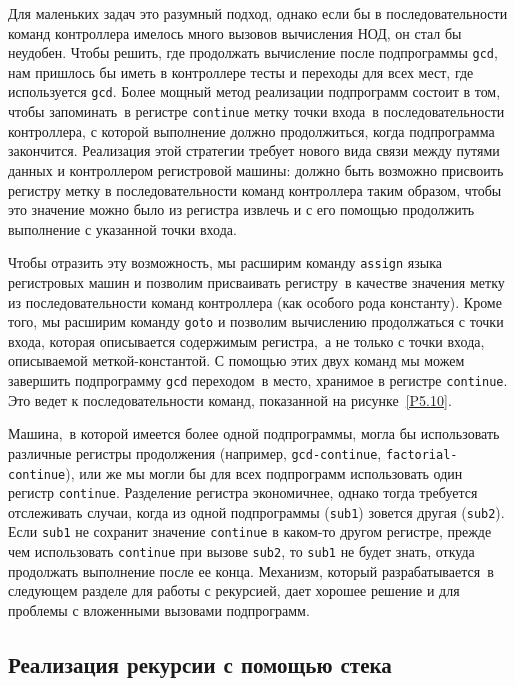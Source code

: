 Для маленьких задач это разумный подход, однако если бы
в последовательности команд контроллера имелось много вызовов
вычисления НОД, он стал бы неудобен.  Чтобы решить, где продолжать
вычисление после подпрограммы {\tt gcd}, нам пришлось бы иметь
в контроллере тесты и переходы для всех мест, где используется
{\tt gcd}. Более мощный метод реализации подпрограмм состоит в
том, чтобы запоминать~в регистре {\tt continue} метку точки
входа~в последовательности контроллера, с которой выполнение должно
продолжиться, когда подпрограмма закончится.  Реализация этой
стратегии требует нового вида связи между путями данных и контроллером
регистровой машины: должно быть возможно присвоить регистру метку в
последовательности команд контроллера таким образом, чтобы это
значение можно было из регистра извлечь и с его помощью продолжить
выполнение с указанной точки входа.

Чтобы отразить эту возможность, мы расширим команду
{\tt assign}
языка регистровых машин и позволим присваивать
регистру~в качестве значения метку из последовательности команд
контроллера (как особого рода константу). Кроме того, мы расширим
команду {\tt goto} 
и позволим вычислению продолжаться с точки входа,
которая описывается содержимым регистра,~а не только с точки входа,
описываемой меткой-константой.  С помощью этих двух команд мы можем
завершить подпрограмму {\tt gcd} переходом~в место, хранимое в
регистре {\tt continue}.  Это ведет к последовательности
команд, показанной на рисунке~\ref{P5.10}.

Машина,~в которой имеется более одной подпрограммы, могла
бы использовать различные регистры продолжения (например,
{\tt gcd-continue}, {\tt facto\-rial-con\-ti\-nue}), или же мы
могли бы для всех подпрограмм использовать один регистр
{\tt continue}.  Разделение регистра экономичнее, однако
тогда требуется отслеживать случаи, когда из одной подпрограммы
({\tt sub1}) зовется другая ({\tt sub2}).  Если
{\tt sub1} не сохранит значение {\tt continue} в
каком-то другом регистре, прежде чем использовать
{\tt continue} при вызове {\tt sub2}, то {\tt sub1}
не будет знать, откуда продолжать выполнение после ее конца.
Механизм, который разрабатывается~в следующем разделе для работы с
рекурсией, дает хорошее решение и для проблемы с вложенными вызовами
подпрограмм.

\subsection{Реализация рекурсии с помощью стека}
\label{USING-A-STACK-TO-IMPLEMENT-RECURSION}

